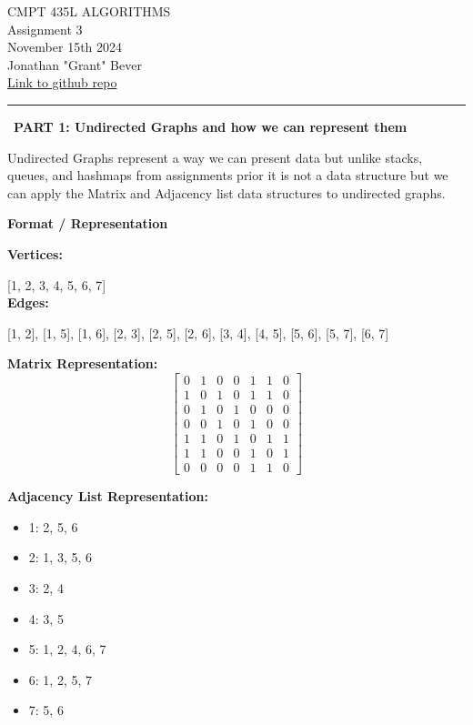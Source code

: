 \documentclass[12pt,letterpaper, onecolumn]{exam}
\begin{document}
\begingroup  
    \centering
    \LARGE CMPT 435L ALGORITHMS\\
    \LARGE Assignment 3\\[0.5em]
    \large November 15th 2024 \\[0.5em]
    \large Jonathan "Grant" Bever\\[0.5em]
    
    \small\href{https://github.com/Grant-Bever/CMPT435L_Algo}{Link to github repo}
    \par
\endgroup
\rule{\textwidth}{0.3pt}


\noindent\ \textbf{PART 1: Undirected Graphs and how we can represent them}
\vspace{.5cm}

\centering Undirected Graphs represent a way we can present data but unlike stacks, queues, and hashmaps from assignments prior it is not a data structure but we can apply the Matrix and Adjacency list data structures to undirected graphs.

\vspace{.4cm}

\textbf{Format / Representation}
\begin{center}
\textbf{Vertices:} 

[1, 2, 3, 4, 5, 6, 7] \\[5pt]
\textbf{Edges:} 

[1, 2], [1, 5], [1, 6], [2, 3], [2, 5], 
[2, 6], [3, 4], [4, 5], [5, 6], [5, 7], [6, 7]

\end{center}

\noindent
\begin{multicols}{2}

\textbf{Matrix Representation:}
\[
\begin{bmatrix}
0 & 1 & 0 & 0 & 1 & 1 & 0 \\
1 & 0 & 1 & 0 & 1 & 1 & 0 \\
0 & 1 & 0 & 1 & 0 & 0 & 0 \\
0 & 0 & 1 & 0 & 1 & 0 & 0 \\
1 & 1 & 0 & 1 & 0 & 1 & 1 \\
1 & 1 & 0 & 0 & 1 & 0 & 1 \\
0 & 0 & 0 & 0 & 1 & 1 & 0
\end{bmatrix}
\]

\columnbreak

\textbf{Adjacency List Representation:}
\begin{itemize}
    \item 1: 2, 5, 6
    \item 2: 1, 3, 5, 6
    \item 3: 2, 4
    \item 4: 3, 5
    \item 5: 1, 2, 4, 6, 7
    \item 6: 1, 2, 5, 7
    \item 7: 5, 6
\end{itemize}

\end{multicols}
\end{document}
